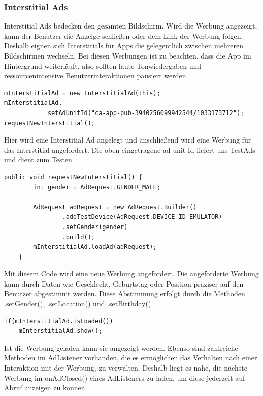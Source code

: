 \documentclass[FIPLY_base.tex]{subfiles}
\begin{document}
\subsubsection{Interstitial Ads}
Interstitial Ads bedecken den gesamten Bildschirm. Wird die Werbung angezeigt, kann der Benutzer die Anzeige schließen oder dem Link der Werbung folgen.
Deshalb eignen sich Interstitials für Apps die gelegentlich zwischen mehreren Bildschirmen wechseln.
Bei diesen Werbungen ist zu beachten, dass die App im Hintergrund weiterläuft, also sollten laute Tonwiedergaben und ressourcenintensive Benutzerinteraktionen pausiert werden. 
\ \\
\begin{lstlisting}
mInterstitialAd = new InterstitialAd(this);
mInterstitialAd.
       		setAdUnitId("ca-app-pub-3940256099942544/1033173712");
requestNewInterstitial();
\end{lstlisting}
Hier wird eine Interstitial Ad angelegt und anschließend wird eine Werbung für das Interstitial angefordert. 
Die oben eingetragene ad unit Id liefert uns TestAds und dient zum Testen.
\ \\
\begin{lstlisting}
public void requestNewInterstitial() {
        int gender = AdRequest.GENDER_MALE;
        
        AdRequest adRequest = new AdRequest.Builder()
                .addTestDevice(AdRequest.DEVICE_ID_EMULATOR)
                .setGender(gender)
                .build();
        mInterstitialAd.loadAd(adRequest);
    }
\end{lstlisting}
Mit diesem Code wird eine neue Werbung angefordert. Die angeforderte Werbung kann durch Daten wie Geschlecht, Geburtstag oder Position präziser auf den Benutzer abgestimmt werden.
Diese Abstimmung erfolgt durch die Methoden .setGender(), .setLocation() und .setBirthday().	
\ \\
\begin{lstlisting}
if(mInterstitialAd.isLoaded()) 
    mInterstitialAd.show();
\end{lstlisting}
Ist die Werbung geladen kann sie angezeigt werden.\newline
Ebenso sind zahlreiche Methoden im AdListener vorhanden, die es ermöglichen das Verhalten nach einer Interaktion mit der Werbung, zu verwalten.\newline
Deshalb liegt es nahe, die nächste Werbung im onAdClosed() eines AdListeners zu laden, um diese jederzeit auf Abruf anzeigen zu können.
\end{document}

